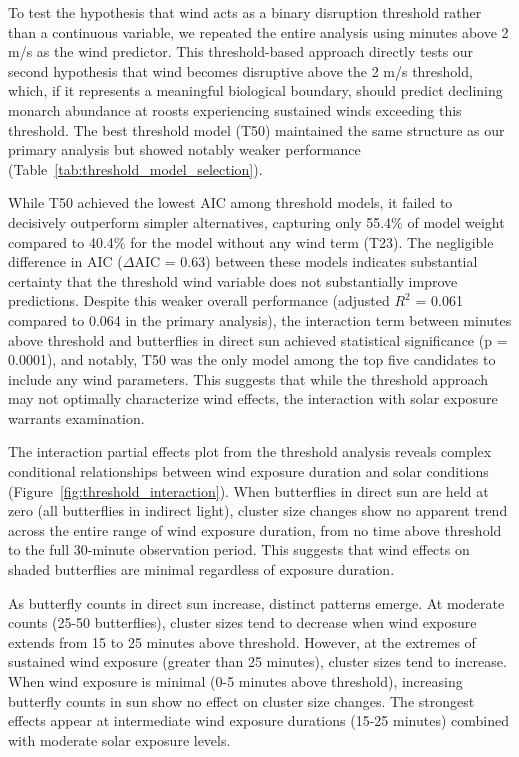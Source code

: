 To test the hypothesis that wind acts as a binary disruption threshold rather than a continuous variable, we repeated the entire analysis using minutes above 2 m/s as the wind predictor. This threshold-based approach directly tests our second hypothesis that wind becomes disruptive above the 2 m/s threshold, which, if it represents a meaningful biological boundary, should predict declining monarch abundance at roosts experiencing sustained winds exceeding this threshold. The best threshold model (T50) maintained the same structure as our primary analysis but showed notably weaker performance (Table~\ref{tab:threshold_model_selection}).

While T50 achieved the lowest AIC among threshold models, it failed to decisively outperform simpler alternatives, capturing only 55.4\% of model weight compared to 40.4\% for the model without any wind term (T23). The negligible difference in AIC ($\Delta$AIC = 0.63) between these models indicates substantial certainty that the threshold wind variable does not substantially improve predictions. Despite this weaker overall performance (adjusted $R^2$ = 0.061 compared to 0.064 in the primary analysis), the interaction term between minutes above threshold and butterflies in direct sun achieved statistical significance (p = 0.0001), and notably, T50 was the only model among the top five candidates to include any wind parameters. This suggests that while the threshold approach may not optimally characterize wind effects, the interaction with solar exposure warrants examination.



The interaction partial effects plot from the threshold analysis reveals complex conditional relationships between wind exposure duration and solar conditions (Figure~\ref{fig:threshold_interaction}). When butterflies in direct sun are held at zero (all butterflies in indirect light), cluster size changes show no apparent trend across the entire range of wind exposure duration, from no time above threshold to the full 30-minute observation period. This suggests that wind effects on shaded butterflies are minimal regardless of exposure duration.

As butterfly counts in direct sun increase, distinct patterns emerge. At moderate counts (25-50 butterflies), cluster sizes tend to decrease when wind exposure extends from 15 to 25 minutes above threshold. However, at the extremes of sustained wind exposure (greater than 25 minutes), cluster sizes tend to increase. When wind exposure is minimal (0-5 minutes above threshold), increasing butterfly counts in sun show no effect on cluster size changes. The strongest effects appear at intermediate wind exposure durations (15-25 minutes) combined with moderate solar exposure levels.


